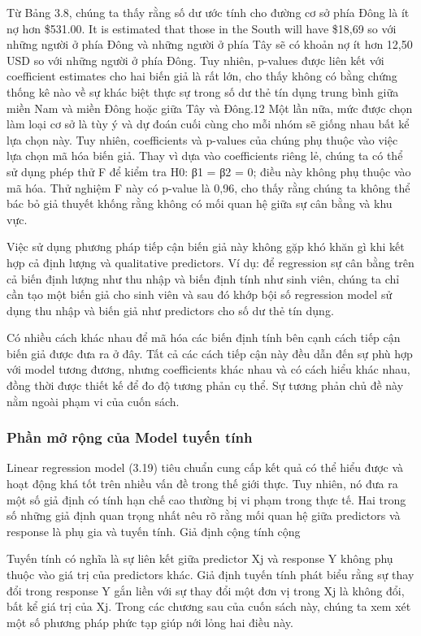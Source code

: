 Từ Bảng 3.8, chúng ta thấy rằng số dư ước tính cho đường cơ sở phía Đông là ít nợ hơn \$531.00. It is estimated that those in the South will have \$18,69 so với những người ở phía Đông và những người ở phía Tây sẽ có khoản nợ ít hơn 12,50 USD so với những người ở phía Đông. Tuy nhiên, p-values được liên kết với coefficient estimates cho hai biến giả là rất lớn, cho thấy không có bằng chứng thống kê nào về sự khác biệt thực sự trong số dư thẻ tín dụng trung bình giữa miền Nam và miền Đông hoặc giữa Tây và Đông.12 Một lần nữa, mức được chọn làm loại cơ sở là tùy ý và dự đoán cuối cùng cho mỗi nhóm sẽ giống nhau bất kể lựa chọn này. Tuy nhiên, coefficients và p-values của chúng phụ thuộc vào việc lựa chọn mã hóa biến giả. Thay vì dựa vào coefficients riêng lẻ, chúng ta có thể sử dụng phép thử F để kiểm tra H0: β1 = β2 = 0; điều này không phụ thuộc vào mã hóa. Thử nghiệm F này có p-value là 0,96, cho thấy rằng chúng ta không thể bác bỏ giả thuyết khống rằng không có mối quan hệ giữa sự cân bằng và khu vực.

Việc sử dụng phương pháp tiếp cận biến giả này không gặp khó khăn gì khi kết hợp cả định lượng và qualitative predictors. Ví dụ: để regression sự cân bằng trên cả biến định lượng như thu nhập và biến định tính như sinh viên, chúng ta chỉ cần tạo một biến giả cho sinh viên và sau đó khớp bội số regression model sử dụng thu nhập và biến giả như predictors cho số dư thẻ tín dụng.

Có nhiều cách khác nhau để mã hóa các biến định tính bên cạnh cách tiếp cận biến giả được đưa ra ở đây. Tất cả các cách tiếp cận này đều dẫn đến sự phù hợp với model tương đương, nhưng coefficients khác nhau và có cách hiểu khác nhau, đồng thời được thiết kế để đo độ tương phản cụ thể. Sự tương phản chủ đề này nằm ngoài phạm vi của cuốn sách.

\subsubsection{Phần mở rộng của Model tuyến tính}

Linear regression model (3.19) tiêu chuẩn cung cấp kết quả có thể hiểu được và hoạt động khá tốt trên nhiều vấn đề trong thế giới thực. Tuy nhiên, nó đưa ra một số giả định có tính hạn chế cao thường bị vi phạm trong thực tế. Hai trong số những giả định quan trọng nhất nêu rõ rằng mối quan hệ giữa predictors và response là phụ gia và tuyến tính. Giả định cộng tính cộng

Tuyến tính có nghĩa là sự liên kết giữa predictor Xj và response Y không phụ thuộc vào giá trị của predictors khác. Giả định tuyến tính phát biểu rằng sự thay đổi trong response Y gắn liền với sự thay đổi một đơn vị trong Xj là không đổi, bất kể giá trị của Xj. Trong các chương sau của cuốn sách này, chúng ta xem xét một số phương pháp phức tạp giúp nới lỏng hai điều này.


